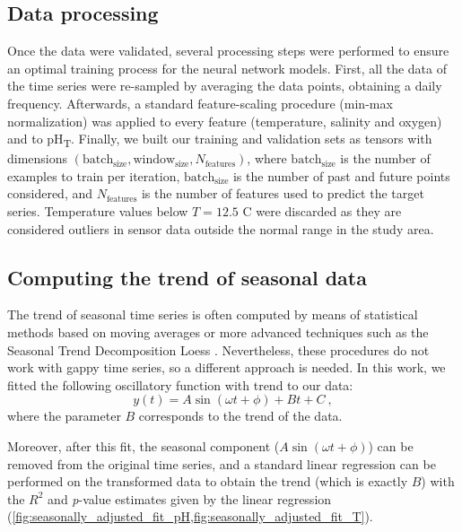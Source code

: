 \subsection{Data processing}

Once the data were validated, several processing steps were performed to ensure
an optimal training process for the neural network models. First, all the data
of the time series were re-sampled by averaging the data points, obtaining a
daily frequency. Afterwards, a standard feature-scaling procedure (min-max
normalization) was applied to every feature (temperature, salinity and oxygen)
and to pH\textsubscript{T}. Finally, we built our training and validation sets
as tensors with dimensions $(\textrm{batch}_\textrm{size},
    \textrm{window}_\textrm{size}, N_{\textrm{features}})$,  where
$\textrm{batch}_\textrm{size}$ is the number of examples to train per
iteration, $\textrm{batch}_\textrm{size}$ is the number of past and future
points considered, and $N_{\textrm{features}}$ is the number of features used
to predict the target series. Temperature values below $T=12.5$ \textdegree C
were discarded as they are considered outliers in sensor data outside the
normal range in the study area.

\subsection{Computing the trend of seasonal data}

The trend of seasonal time series is often computed by means of statistical
methods based on moving averages or more advanced techniques such as the
Seasonal Trend Decomposition Loess \cite{cleveland1990stl}. Nevertheless, these
procedures do not work with gappy time series, so a different approach is
needed. In this work, we fitted the following oscillatory function with trend
to
our data:
\begin{equation}\label{eq:seasonal_fit}
    y(t)=A\sin(\omega t+\phi)+Bt+C \ ,
\end{equation}
where the parameter $B$ corresponds to the trend of the data.

Moreover, after this fit, the seasonal component ($A\sin(\omega t + \phi)$)
can be removed from the original time series, and a standard linear regression
can be performed on the transformed data to obtain the trend (which is exactly
$B$) with the $R^2$ and \emph{p}-value estimates given by the linear regression
(\cref{fig:seasonally_adjusted_fit_pH,fig:seasonally_adjusted_fit_T}).

